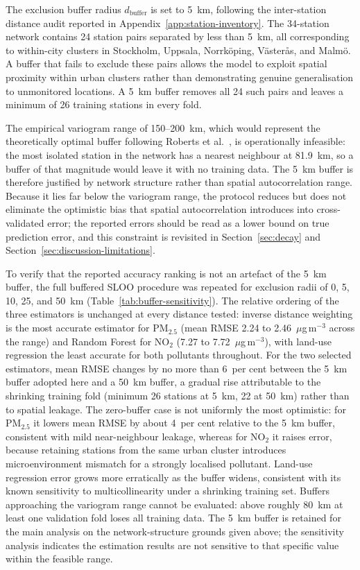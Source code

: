 \documentclass[11pt,a4paper]{article}
\begin{document}
The exclusion buffer radius $d_{\text{buffer}}$ is set to 5~km, following the inter-station distance audit reported in Appendix~\ref{app:station-inventory}. The 34-station network contains 24 station pairs separated by less than 5~km, all corresponding to within-city clusters in Stockholm, Uppsala, Norrköping, Västerås, and Malmö. A buffer that fails to exclude these pairs allows the model to exploit spatial proximity within urban clusters rather than demonstrating genuine generalisation to unmonitored locations. A 5~km buffer removes all 24 such pairs and leaves a minimum of 26 training stations in every fold.

The empirical variogram range of 150--200~km, which would represent the theoretically optimal buffer following Roberts et al.~\cite{roberts_spatial_cv_2017}, is operationally infeasible: the most isolated station in the network has a nearest neighbour at 81.9~km, so a buffer of that magnitude would leave it with no training data. The 5~km buffer is therefore justified by network structure rather than spatial autocorrelation range. Because it lies far below the variogram range, the protocol reduces but does not eliminate the optimistic bias that spatial autocorrelation introduces into cross-validated error; the reported errors should be read as a lower bound on true prediction error, and this constraint is revisited in Section~\ref{sec:decay} and Section~\ref{sec:discussion-limitations}.

To verify that the reported accuracy ranking is not an artefact of the 5~km buffer, the full buffered SLOO procedure was repeated for exclusion radii of 0, 5, 10, 25, and 50~km (Table~\ref{tab:buffer-sensitivity}). The relative ordering of the three estimators is unchanged at every distance tested: inverse distance weighting is the most accurate estimator for PM$_{2.5}$ (mean RMSE 2.24 to 2.46~$\mu$g\,m$^{-3}$ across the range) and Random Forest for NO$_2$ (7.27 to 7.72~$\mu$g\,m$^{-3}$), with land-use regression the least accurate for both pollutants throughout. For the two selected estimators, mean RMSE changes by no more than 6~per cent between the 5~km buffer adopted here and a 50~km buffer, a gradual rise attributable to the shrinking training fold (minimum 26 stations at 5~km, 22 at 50~km) rather than to spatial leakage. The zero-buffer case is not uniformly the most optimistic: for PM$_{2.5}$ it lowers mean RMSE by about 4~per cent relative to the 5~km buffer, consistent with mild near-neighbour leakage, whereas for NO$_2$ it raises error, because retaining stations from the same urban cluster introduces microenvironment mismatch for a strongly localised pollutant. Land-use regression error grows more erratically as the buffer widens, consistent with its known sensitivity to multicollinearity under a shrinking training set. Buffers approaching the variogram range cannot be evaluated: above roughly 80~km at least one validation fold loses all training data. The 5~km buffer is retained for the main analysis on the network-structure grounds given above; the sensitivity analysis indicates the estimation results are not sensitive to that specific value within the feasible range.
\end{document}
